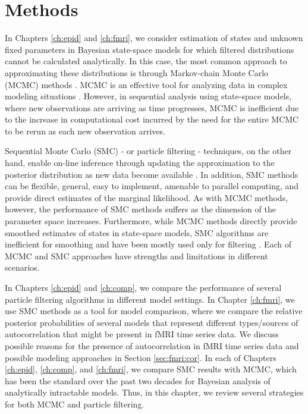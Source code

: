 \chapter{Methods \label{ch:meth}}

In Chapters \ref{ch:epid} and \ref{ch:fmri}, we consider estimation of states and unknown fixed parameters in Bayesian state-space models for which filtered distributions cannot be calculated analytically. In this case, the most common approach to approximating these distributions is through Markov-chain Monte Carlo (MCMC) methods \citep{Gelf:Smit:samp:1990}. MCMC is an effective tool for analyzing data in complex modeling situations \citep{Robe:Case:mont:2004}. However, in sequential analysis using state-space models, where new observations are arriving as time progresses, MCMC is inefficient due to the increase in computational cost incurred by the need for the entire MCMC to be rerun as each new observation arrives.

Sequential Monte Carlo (SMC) - or particle filtering - techniques, on the other hand, enable on-line inference through updating the approximation to the posterior distribution as new data become available \citep{Douc:deFr:Gord:sequ:2001, cappe2007overview}. In addition, SMC methods can be flexible, general, easy to implement, amenable to parallel computing, and provide direct estimates of the marginal likelihood. As with MCMC methods, however, the performance of SMC methods suffers as the dimension of the parameter space increases. Furthermore, while MCMC methods directly provide smoothed estimates of states in state-space models, SMC algorithms are inefficient for smoothing and have been mostly used only for filtering \cite[Section 5][]{douc:joh:tut:2009}. Each of MCMC and SMC approaches have strengths and limitations in different scenarios.

In Chapters \ref{ch:epid} and \ref{ch:comp}, we compare the performance of several particle filtering algorithms in different model settings. In Chapter \ref{ch:fmri}, we use SMC methods as a tool for model comparison, where we compare the relative posterior probabilities of several models that represent different types/sources of autocorrelation that might be present in fMRI time series data. We discuss possible reasons for the presence of autocorrelation in fMRI time series data and possible modeling approaches in Section \ref{sec:fmri:cor}. In each of Chapters \ref{ch:epid}, \ref{ch:comp}, and \ref{ch:fmri}, we compare SMC results with MCMC, which has been the standard over the past two decades for Bayesian analysis of analytically intractable models. Thus, in this chapter, we review several strategies for both MCMC and particle filtering.

